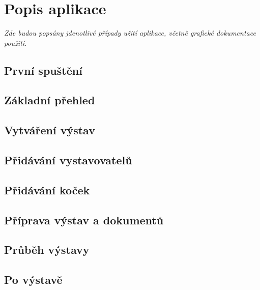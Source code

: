 \chapter{Popis aplikace}
\textit{Zde budou popsány jdenotlivé případy užití aplikace, včetně grafické dokumentace použití.}
\section{První spuštění}
\section{Základní přehled}

\section{Vytváření výstav}
\section{Přidávání vystavovatelů}
\section{Přidávání koček}
\section{Příprava výstav a dokumentů}
\section{Průběh výstavy}
\section{Po výstavě}
